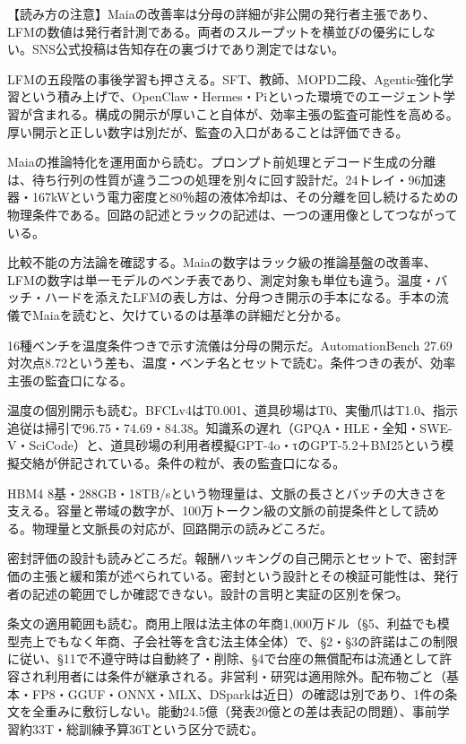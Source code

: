 \documentclass[lualatex,a4paper,10pt]{jlreq}
\begin{document}
\begin{tcolorbox}[colback=SurveySoft,colframe=SurveyRule,arc=1mm,boxrule=0.4pt,left=2mm,right=2mm]
【読み方の注意】Maiaの改善率は分母の詳細が非公開の発行者主張であり、LFMの数値は発行者計測である。両者のスループットを横並びの優劣にしない。SNS公式投稿は告知存在の裏づけであり測定ではない。
\end{tcolorbox}
\cite{B09,B66,B10,B67,B68,B11,B69,B12}

LFMの五段階の事後学習も押さえる。SFT、教師、MOPD二段、Agentic強化学習という積み上げで、OpenClaw・Hermes・Piといった環境でのエージェント学習が含まれる。構成の開示が厚いこと自体が、効率主張の監査可能性を高める。厚い開示と正しい数字は別だが、監査の入口があることは評価できる。
\cite{B11,B69,B12}


Maiaの推論特化を運用面から読む。プロンプト前処理とデコード生成の分離は、待ち行列の性質が違う二つの処理を別々に回す設計だ。24トレイ・96加速器・167kWという電力密度と80％超の液体冷却は、その分離を回し続けるための物理条件である。回路の記述とラックの記述は、一つの運用像としてつながっている。
\cite{B09,B66,B10,B67,B68}


比較不能の方法論を確認する。Maiaの数字はラック級の推論基盤の改善率、LFMの数字は単一モデルのベンチ表であり、測定対象も単位も違う。温度・バッチ・ハードを添えたLFMの表し方は、分母つき開示の手本になる。手本の流儀でMaiaを読むと、欠けているのは基準の詳細だと分かる。
\cite{B09,B66,B10,B67,B68,B11,B69,B12}


16種ベンチを温度条件つきで示す流儀は分母の開示だ。AutomationBench 27.69対次点8.72という差も、温度・ベンチ名とセットで読む。条件つきの表が、効率主張の監査口になる。
\cite{B11,B69,B12}


温度の個別開示も読む。BFCLv4はT0.001、道具砂場はT0、実働爪はT1.0、指示追従は掃引で96.75・74.69・84.38。知識系の遅れ（GPQA・HLE・全知・SWE-V・SciCode）と、道具砂場の利用者模擬GPT-4o・τのGPT-5.2＋BM25という模擬交絡が併記されている。条件の粒が、表の監査口になる。
\cite{B11,B69,B12}


HBM4 8基・288GB・18TB/sという物理量は、文脈の長さとバッチの大きさを支える。容量と帯域の数字が、100万トークン級の文脈の前提条件として読める。物理量と文脈長の対応が、回路開示の読みどころだ。
\cite{B09,B66,B10,B67,B68}


密封評価の設計も読みどころだ。報酬ハッキングの自己開示とセットで、密封評価の主張と緩和策が述べられている。密封という設計とその検証可能性は、発行者の記述の範囲でしか確認できない。設計の言明と実証の区別を保つ。
\cite{B11,B69,B12}


条文の適用範囲も読む。商用上限は法主体の年商1,000万ドル（§5、利益でも模型売上でもなく年商、子会社等を含む法主体全体）で、§2・§3の許諾はこの制限に従い、§11で不遵守時は自動終了・削除、§4で台座の無償配布は流通として許容され利用者には条件が継承される。非営利・研究は適用除外。配布物ごと（基本・FP8・GGUF・ONNX・MLX、DSparkは近日）の確認は別であり、1件の条文を全重みに敷衍しない。能動24.5億（発表20億との差は表記の問題）、事前学習約33T・総訓練予算36Tという区分で読む。
\cite{B11,B69,B12,B90}
\end{document}
